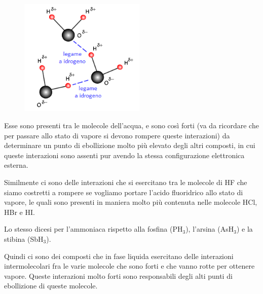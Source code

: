 \begin{minipage}{0.39 \textwidth}
    \begin{figure}[H]
        \includegraphics[width=6cm]{immagini/legame_a_idrogeno.png}
    \end{figure}
\end{minipage}
\begin{minipage}{0.6 \textwidth}
Esse sono presenti tra le molecole dell'acqua, e sono così forti (va da ricordare che per passare allo stato di vapore si devono rompere queste interazioni) da determinare un punto di ebollizione molto più elevato degli altri composti, in cui queste interazioni sono assenti pur avendo la stessa configurazione elettronica esterna.

Similmente ci sono delle interazioni che si esercitano tra le molecole di HF che siamo costretti a rompere se vogliamo portare l'acido fluoridrico allo stato di vapore, le quali sono presenti in maniera molto più contenuta nelle molecole HCl, HBr e HI.

Lo stesso dicesi per l'ammoniaca rispetto alla fosfina (PH$_3$), l'arsina (AsH$_3$) e la stibina (SbH$_3$).
\end{minipage}

\vspace{0.2cm}Quindi ci sono dei composti che in fase liquida esercitano delle interazioni intermolecolari fra le varie molecole che sono forti e che vanno rotte per ottenere vapore. Queste interazioni molto forti sono responsabili degli alti punti di ebollizione di queste molecole.